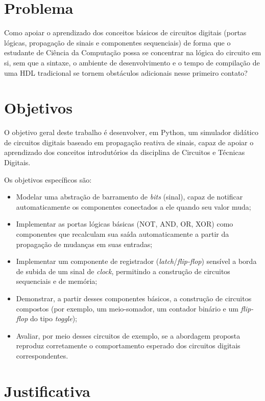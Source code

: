 \section{Problema}

Como apoiar o aprendizado dos conceitos básicos de circuitos digitais (portas lógicas, propagação de sinais e componentes sequenciais) de forma que o estudante de Ciência da Computação possa se concentrar na lógica do circuito em si, sem que a sintaxe, o ambiente de desenvolvimento e o tempo de compilação de uma HDL tradicional se tornem obstáculos adicionais nesse primeiro contato?

\section{Objetivos}

O objetivo geral deste trabalho é desenvolver, em Python, um simulador didático de circuitos digitais baseado em propagação reativa de sinais, capaz de apoiar o aprendizado dos conceitos introdutórios da disciplina de Circuitos e Técnicas Digitais.

Os objetivos específicos são:

\begin{itemize}
    \item Modelar uma abstração de barramento de \textit{bits} (sinal), capaz de notificar automaticamente os componentes conectados a ele quando seu valor muda;
    \item Implementar as portas lógicas básicas (NOT, AND, OR, XOR) como componentes que recalculam sua saída automaticamente a partir da propagação de mudanças em suas entradas;
    \item Implementar um componente de registrador (\textit{latch}/\textit{flip-flop}) sensível a borda de subida de um sinal de \textit{clock}, permitindo a construção de circuitos sequenciais e de memória;
    \item Demonstrar, a partir desses componentes básicos, a construção de circuitos compostos (por exemplo, um meio-somador, um contador binário e um \textit{flip-flop} do tipo \textit{toggle});
    \item Avaliar, por meio desses circuitos de exemplo, se a abordagem proposta reproduz corretamente o comportamento esperado dos circuitos digitais correspondentes.
\end{itemize}

\section{Justificativa}

